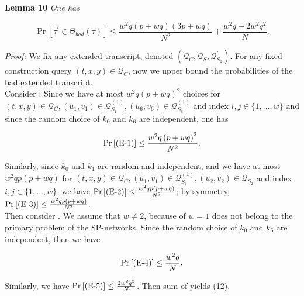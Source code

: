 \noindent \textbf{Lemma 10} \emph{One has}

\begin{equation}
\operatorname{Pr}[\tau^{\prime} \in \Theta_{bad}(\tau)] \leq \frac{w^2 q (p+w q) (3 p +w q)}{N^{2}} + \frac{w^{2} q + 2 w^2 q^2}{N}.
\end{equation}

\noindent \emph{Proof:} We fix any extended transcript, denoted $\left(\mathcal{Q}_{C}, \mathcal{Q}_{S}, \mathcal{Q}_{S_{1}}^{\prime}\right)$. For any fixed construction query $(t, x, y) \in \mathcal{Q}_{C}$, now we upper bound the probabilities of the bad extended transcript.\\

\noindent Consider \eone: Since we have at most $w^{2} q \left(p+w q\right)^{2}$ choices for $(t, x, y) \in \mathcal{Q}_{C}, \left(u_{1}, v_{1}\right) \in \mathcal{Q}_{S_{1}}^{(1)}, \left(u_{6}, v_{6}\right) \in \mathcal{Q}_{S_{6}}^{(1)}$ and index $i, j \in \{1, \ldots, w\}$ and since the random choice of $k_{0}$ and $k_{6}$ are independent, one has

$$
\operatorname{Pr}\left[\text{(E-1)}\right] \leq \frac{w^{2} q \left(p+w q\right)^{2}}{N^{2}}.
$$

\noindent Similarly, since $k_{0}$ and $k_{1}$ are random and independent, and we have at most $w^{2} q p \left(p+w q\right)$ for $(t, x, y) \in \mathcal{Q}_{C}, \left(u_{1}, v_{1}\right) \in \mathcal{Q}_{S_{1}}^{(1)}, \left(u_{2}, v_{2}\right) \in \mathcal{Q}_{S_{2}}$ and index $i, j \in \{1, \ldots, w\}$, we have $\operatorname{Pr}\left[\text{(E-2)}\right] \leq \frac{w^{2} q p \left(p+w q\right)}{N^{2}}$; by symmetry, $\operatorname{Pr}\left[\text{(E-3)}\right] \leq \frac{w^{2} q p \left(p+w q\right)}{N^{2}}$. \\

\noindent Then consider \bfour. We assume that $w \neq 2$, because of $w = 1$ does not belong to the primary problem of the SP-networks. Since the random choice of $k_{0}$ and $k_{6}$ are independent, then we have

$$
\operatorname{Pr}\left[\text{(E-4)}\right] \leq \frac{w^{2} q}{N}.
$$

\noindent  Similarly, we have $\operatorname{Pr}\left[\text{(E-5)}\right] \leq \frac{2 w^{2} q^2}{N}$. Then sum of yields (12).\\

